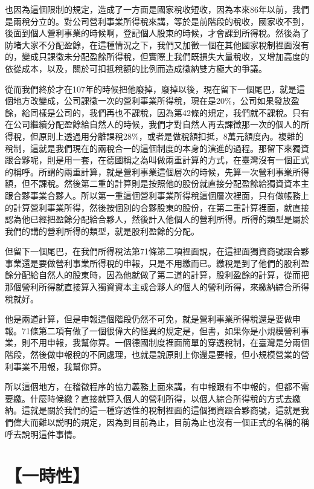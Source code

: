 \documentclass[]{ctexbook}
\begin{document}
也因為這個限制的規定，造成了一方面是國家稅收短收，因為本來86年以前，我們是兩稅分立的。對公司營利事業所得稅來講，等於是前階段的稅收，國家收不到，後面到個人營利事業的時候啊，登記個人股東的時候，才會課到所得稅。然後為了防堵大家不分配盈餘，在這種情況之下，我們又加徵一個在其他國家稅制裡面沒有的，變成只課徵未分配盈餘所得稅，但實際上我們既損失大量稅收，又增加高度的依從成本，以及，關於可扣抵稅額的比例而造成徵納雙方極大的爭議。

從而我們終於才在107年的時候把他廢掉，廢掉以後，現在留下一個尾巴，就是這個地方改變成，公司課徵一次的營利事業所得稅，現在是20\%，公司如果發放盈餘，給同樣是公司的，我們再也不課稅，因為第42條的規定，我們就不課稅。只有在公司繼續分配盈餘給自然人的時候，我們才對自然人再去課徵那一次的個人的所得稅，但原則上透過用分離課稅28\%，或者是做稅額扣抵，8萬元額度內。複雜的稅制，這就是我們現在的兩稅合一的這個制度的本身的演進的過程。那留下來獨資跟合夥呢，則是用一套，在德國稱之為叫做兩重計算的方式，在臺灣沒有一個正式的稱呼。所謂的兩重計算，就是營利事業這個層次的時候，先算一次營利事業所得額，但不課稅。然後第二重的計算則是按照他的股份就直接分配盈餘給獨資資本主跟合夥事業合夥人。所以第一重這個營利事業所得稅這個層次裡面，只有做帳務上的計算營利事業所得，然後按個別的合夥股東的股份，在第二重計算裡面，就直接認為他已經把盈餘分配給合夥人，然後計入他個人的營利所得。所得的類型是屬於我們的講的營利所得的類型，就是股利盈餘的分配。

但留下一個尾巴，在我們所得稅法第71條第二項裡面說，在這裡面獨資商號跟合夥事業還是要做營利事業所得稅的申報，只是不用繳而已。繳稅是到了他們的股利盈餘分配給自然人的股東時，因為他就做了第二道的計算，股利盈餘的計算，從而把那個營利所得就直接算入獨資資本主或合夥人的個人的營利所得，來繳納綜合所得稅就好。

他是兩道計算，但是申報這個階段仍然不可免，就是營利事業所得稅還是要做申報。71條第二項有做了一個很偉大的怪異的規定是，但書，如果你是小規模營利事業，則不用申報，我幫你算。一個德國制度裡面簡單的穿透稅制，在臺灣是分兩個階段，然後做申報稅的不同處理，也就是說原則上你還是要報，但小規模營業的營利事業不用報，我幫你算。

所以這個地方，在稽徵程序的協力義務上面來講，有申報跟有不申報的，但都不需要繳。什麼時候繳？直接就算入個人的營利所得，以個人綜合所得稅的方式去繳納。這就是關於我們的這一種穿透性的稅制裡面的這個獨資跟合夥商號，這就是我們偉大而難以説明的規定，因為到目前為止，目前為止也沒有一個正式的名稱的稱呼去說明這件事情。

\hypertarget{ux4e00ux6642ux6027}{%
\section{【一時性】}\label{ux4e00ux6642ux6027}}
\end{document}
